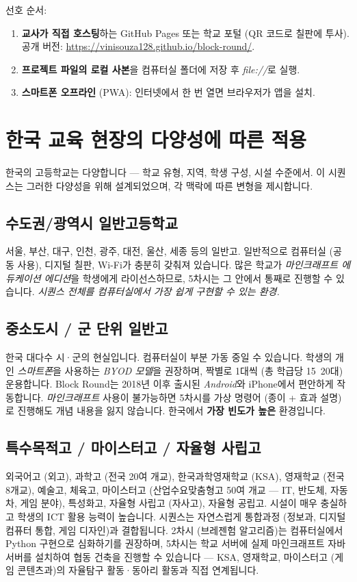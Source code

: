 \documentclass[12pt,a4paper]{scrartcl}
\newcommand{\acc}[1]{\textcolor{accent}{\textbf{#1}}}
\begin{document}
선호 순서:

\begin{enumerate}[leftmargin=1.5em,itemsep=0.15em,topsep=0.3em]
  \item \textbf{교사가 직접 호스팅}하는 GitHub Pages 또는 학교 포털 (QR 코드로 칠판에 투사). 공개 버전: \url{https://vinisouza128.github.io/block-round/}.
  \item \textbf{프로젝트 파일의 로컬 사본}을 컴퓨터실 폴더에 저장 후 \emph{file://}로 실행.
  \item \textbf{스마트폰 오프라인} (PWA): 인터넷에서 한 번 열면 브라우저가 앱을 설치.
\end{enumerate}

\section{한국 교육 현장의 다양성에 따른 적용}\label{sec:adapt}

한국의 고등학교는 다양합니다 --- 학교 유형, 지역, 학생 구성, 시설 수준에서. 이 시퀀스는 그러한 다양성을 위해 설계되었으며, 각 맥락에 따른 변형을 제시합니다.

\subsection{수도권/광역시 일반고등학교}
서울, 부산, 대구, 인천, 광주, 대전, 울산, 세종 등의 일반고. 일반적으로 컴퓨터실 (공동 사용), 디지털 칠판, Wi-Fi가 충분히 갖춰져 있습니다. 많은 학교가 \emph{마인크래프트 에듀케이션 에디션}을 학생에게 라이선스하므로, 5차시는 그 안에서 통째로 진행할 수 있습니다. \emph{시퀀스 전체를 컴퓨터실에서 가장 쉽게 구현할 수 있는 환경.}

\subsection{중소도시 / 군 단위 일반고}
한국 대다수 시·군의 현실입니다. 컴퓨터실이 부분 가동 중일 수 있습니다. 학생의 개인 \emph{스마트폰}을 사용하는 \emph{BYOD 모델}을 권장하며, 짝별로 1대씩 (총 학급당 15~20대) 운용합니다. Block Round는 2018년 이후 출시된 \emph{Android}와 iPhone에서 편안하게 작동합니다. \emph{마인크래프트} 사용이 불가능하면 5차시를 가상 명령어 (종이 + 효과 설명)로 진행해도 개념 내용을 잃지 않습니다. 한국에서 \acc{가장 빈도가 높은} 환경입니다.

\subsection{특수목적고 / 마이스터고 / 자율형 사립고}
외국어고 (외고), 과학고 (전국 20여 개교), 한국과학영재학교 (KSA), 영재학교 (전국 8개교), 예술고, 체육고, 마이스터고 (산업수요맞춤형고 50여 개교 --- IT, 반도체, 자동차, 게임 분야), 특성화고, 자율형 사립고 (자사고), 자율형 공립고. 시설이 매우 충실하고 학생의 ICT 활용 능력이 높습니다. 시퀀스는 자연스럽게 통합과정 (정보과, 디지털컴퓨터 통합, 게임 디자인)과 결합됩니다. 2차시 (브레젠험 알고리즘)는 컴퓨터실에서 Python 구현으로 심화하기를 권장하며, 5차시는 학교 서버에 실제 마인크래프트 자바 서버를 설치하여 협동 건축을 진행할 수 있습니다 --- KSA, 영재학교, 마이스터고 (게임 콘텐츠과)의 자율탐구 활동·동아리 활동과 직접 연계됩니다.
\end{document}
